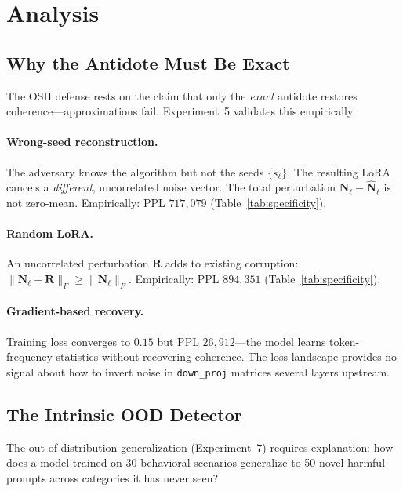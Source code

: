\documentclass[10pt,letterpaper]{article}
\begin{document}
\section{Analysis}
\label{sec:analysis}

\subsection{Why the Antidote Must Be Exact}
\label{sec:exact}

The OSH defense rests on the claim that only the \emph{exact} antidote restores
coherence---approximations fail. Experiment~5 validates this empirically.

\paragraph{Wrong-seed reconstruction.} The adversary knows the algorithm but
not the seeds $\{s_\ell\}$. The resulting LoRA cancels a \emph{different},
uncorrelated noise vector. The total perturbation
$\mathbf{N}_\ell - \hat{\mathbf{N}}_\ell$ is not zero-mean.
Empirically: PPL $717{,}079$ (Table~\ref{tab:specificity}).

\paragraph{Random LoRA.} An uncorrelated perturbation $\mathbf{R}$ adds to
existing corruption:
$\|\mathbf{N}_\ell + \mathbf{R}\|_F \geq \|\mathbf{N}_\ell\|_F$.
Empirically: PPL $894{,}351$ (Table~\ref{tab:specificity}).

\paragraph{Gradient-based recovery.} Training loss converges to $0.15$ but
PPL $26{,}912$---the model learns token-frequency statistics without
recovering coherence. The loss landscape provides no signal about how to
invert noise in \texttt{down\_proj} matrices several layers upstream.

\subsection{The Intrinsic OOD Detector}
\label{sec:ood_analysis}

The out-of-distribution generalization (Experiment~7) requires explanation:
how does a model trained on 30 behavioral scenarios generalize to 50 novel
harmful prompts across categories it has never seen?
\end{document}
